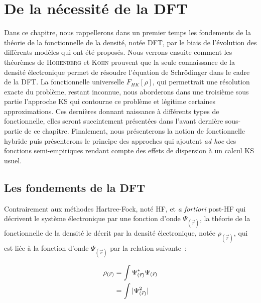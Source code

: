 	\section[DFT]{De la nécessité de la DFT}
	
	Dans ce chapitre, nous rappellerons dans un premier temps les fondements de la théorie de la fonctionnelle de la densité, notée DFT, par le biais de l'évolution des différents modèles qui ont été proposés. Nous verrons ensuite comment les théorèmes de \textsc{Hohenberg} et \textsc{Kohn} prouvent que la seule connaissance de la densité électronique permet de résoudre l'équation de Schr\"{o}dinger dans le cadre de la DFT. La fonctionnelle universelle $F_{HK}[\rho]$, qui permettrait une résolution exacte du problème, restant inconnue, nous aborderons dans une troisième sous partie l'approche KS qui contourne ce problème et légitime certaines approximations. Ces dernières donnant naissance à différents types de fonctionnelle, elles seront succintement présentées dans l’avant dernière sous-partie de ce chapitre. Finalement, nous présenterons la notion de fonctionnelle hybride puis présenterons le principe des approches qui ajoutent \textit{ad hoc} des fonctions semi-empiriques rendant compte des effets de dispersion à un calcul KS usuel.
	
	\subsection{Les fondements de la DFT}
	
	Contrairement aux méthodes Hartree-Fock, noté HF, et \textit{a fortiori} post-HF qui décrivent le système électronique par une fonction d'onde $\Psi_{(\vec{r})}$, la théorie de la fonctionnelle de la densité le décrit par la densité électronique, notée $\rho_{(\vec{r})}$, qui est liée à la fonction d'onde $\Psi_{(\vec{r})}$ par la relation suivante~:
	
	\begin{align}
	\rho_{(\vec{r})} &= \int \Psi_{(\vec{r})}^{*} \Psi_{(\vec{r})} \\
	&= \int |\Psi_{(\vec{r})}^{2}| \notag
	\end{align}
	
